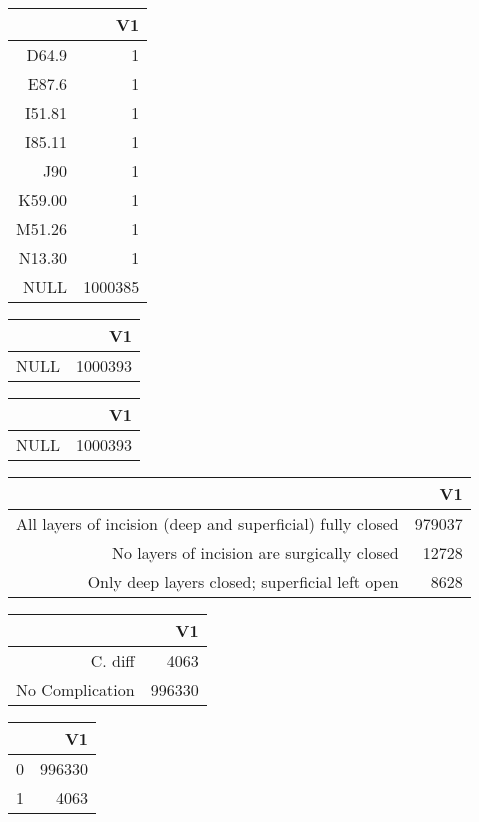 \bigskip\bigskip
\centering
\begin{tabular}{rr}
  \hline
 & V1 \\ 
  \hline
D64.9 &   1 \\ 
  E87.6 &   1 \\ 
  I51.81 &   1 \\ 
  I85.11 &   1 \\ 
  J90 &   1 \\ 
  K59.00 &   1 \\ 
  M51.26 &   1 \\ 
  N13.30 &   1 \\ 
  NULL & 1000385 \\ 
   \hline
\end{tabular}

\bigskip\bigskip
\centering
\begin{tabular}{rr}
  \hline
 & V1 \\ 
  \hline
NULL & 1000393 \\ 
   \hline
\end{tabular}

\bigskip\bigskip
\centering
\begin{tabular}{rr}
  \hline
 & V1 \\ 
  \hline
NULL & 1000393 \\ 
   \hline
\end{tabular}

\bigskip\bigskip
\centering
\begin{tabular}{rr}
  \hline
 & V1 \\ 
  \hline
All layers of incision (deep and superficial) fully closed & 979037 \\ 
  No layers of incision are surgically closed & 12728 \\ 
  Only deep layers closed; superficial left open & 8628 \\ 
   \hline
\end{tabular}

\bigskip\bigskip
\centering
\begin{tabular}{rr}
  \hline
 & V1 \\ 
  \hline
C. diff & 4063 \\ 
  No Complication & 996330 \\ 
   \hline
\end{tabular}

\bigskip\bigskip
\centering
\begin{tabular}{rr}
  \hline
 & V1 \\ 
  \hline
0 & 996330 \\ 
  1 & 4063 \\ 
   \hline
\end{tabular}

